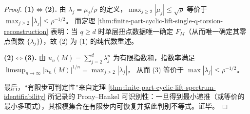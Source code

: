 \begin{proof}
\textbf{(1)\(\Leftrightarrow\)(2).}
由 \(\lambda_j=\mu_j/\rho\) 的定义，\(\max_{j\ge2}|\mu_j|\le \sqrt{\rho}\) 等价于 \(\max_{j\ge2}|\lambda_j|\le \rho^{-1/2}\)。
而定理 \ref{thm:finite-part-cyclic-lift-single-q-torsion-reconstruction} 表明：当 \(q\ge d\) 时单层扭点数据唯一确定 \(F_M\)（从而唯一确定其零点倒数 \(\{\lambda_j\}\)），故 (2) 为 (1) 的纯代数重述。
\par
\textbf{(2)\(\Leftrightarrow\)(3).}
由 \(u_n(M)=\sum_{j=2}^{d}\lambda_j^n\) 为有限指数和，指数率满足
\(
\limsup_{n\to\infty}|u_n(M)|^{1/n}=\max_{j\ge2}|\lambda_j|
\)，
从而 (3) 等价于 \(\max|\lambda_j|\le\rho^{-1/2}\)。
\par
最后，“有限步可判定性”来自定理 \ref{thm:finite-part-cyclic-lift-spectrum-identifiability} 所记录的 Prony--Hankel 可识别性：一旦得到最小递推（或等价的最小多项式），其根模集合在有限步内可恢复并据此判别不等式。证毕。
\end{proof}
